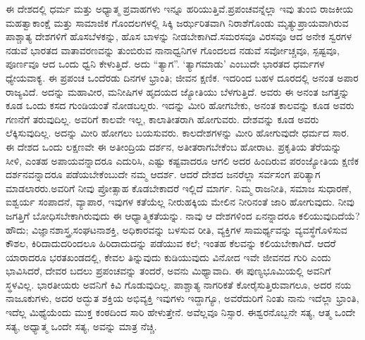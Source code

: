 ಈ ದೇಶದಲ್ಲಿ ಧರ್ಮ ಮತ್ತು ಅಧ್ಯಾತ್ಮ ಪ್ರವಾಹಗಳು ಇನ್ನೂ ಹರಿಯುತ್ತಿವೆ.\break ಪ್ರಪಂಚವನ್ನೆಲ್ಲಾ ಇವು ತುಂಬಿ ರಾಜಕೀಯ ಮಹತ್ವಾಕಾಂಕ್ಷೆ ಮತ್ತು ಸಾಮಾಜಿಕ ಗೊಂದಲಗಳಲ್ಲಿ ಸಿಕ್ಕಿ ಜರ್ಝರಿತವಾಗಿ ನಿರಾಶೆಗೊಂಡು ಮೃತ್ಯುಪ್ರಾಯವಾಗಿರುವ ಪಾಶ್ಚಾತ್ಯ ದೇಶಗಳಿಗೆ ಹೊಸಬೆಳಕನ್ನು, ಹೊಸ ಬಾಳನ್ನು ನೀಡಬೇಕಾಗಿದೆ.\break ಸಮರಸವೂ ವಿರಸವೂ ಆದ ಅನೇಕ ಸ್ವರಗಳ ನಡುವೆ ಭಾರತದ ವಾತಾ\-ವರಣವನ್ನು ತುಂಬಿರುವ ನಾನಾಧ್ವನಿಗಳ ಗೊಂದಲದ ನಡುವೆ ಸರ್ವೋಚ್ಚವೂ, ಸ್ಪಷ್ಟವೂ, ಪೂರ್ಣವೂ ಆದ ಒಂದು ಧ್ವನಿ ಕೇಳುತ್ತಿದೆ. ಅದು “ತ್ಯಾಗ”. ‘ತ್ಯಾಗಮಾಡು’ ಎಂಬುದೇ ಭಾರತದ ಧರ್ಮಗಳ ಧ್ಯೇಯವಾಕ್ಯ. ಈ ಪ್ರಪಂಚ ಒಂದೆರಡು ದಿನಗಳ ಭ್ರಾಂತಿ; ಜೀವನ ಕ್ಷಣಿಕ. ಇದರಿಂದ ಬಹಳ ದೂರದಲ್ಲಿ ಅನಂತ ಅಪಾರ ರಾಜ್ಯವಿದೆ. ಅದನ್ನು ಮಹಾವೀರ, ಮನೀಷಿಗಳ ಹೃದಯದ ಜ್ಯೋತಿಯು ಬೆಳಗುತ್ತಿದೆ. ಅವರು ಈ ಅನಂತ ಜಗತ್ತನ್ನು ಕೂಡ ಒಂದು ಕಸದ ಗುಂಡಿಯಂತೆ ನೋಡಬಲ್ಲರು. ಇದನ್ನು ಮೀರಿ ಹೋಗಬೇಕು, ಅನಂತ ಕಾಲವನ್ನು ಕೂಡ ಅವರು ಗಣನೆಗೆ ತರುವುದಿಲ್ಲ. ಅವರಿಗೆ ಕಾಲವೇ ಇಲ್ಲ, ಕಾಲಾತೀತರಾಗಿ ಹೋಗುವರು. ದೇಶವನ್ನು ಕೂಡ ಅವರು ಲೆಕ್ಕಿಸುವುದಿಲ್ಲ. ಅದನ್ನು ಮೀರಿ ಹೋಗಲು ಬಯಸುವರು. ಕಾಲದೇಶಗಳನ್ನು ಮೀರಿ ಹೋಗುವುದೇ ಧರ್ಮದ ಸಾರ. ಈ ದೇಶದ ಒಂದು ಲಕ್ಷಣವೇ ಈ ಅತೀಂದ್ರಿಯ ದರ್ಶನ, ಅತೀತರಾಗಬೇಕೆಂಬ ಹೋರಾಟ. ಪ್ರಕೃತಿಯ ತೆರೆಯನ್ನು ಸೀಳಿ, ಎಂತಹ ಅಪಾಯವನ್ನಾದರೂ ಎದುರಿಸಿ, ಎಷ್ಟು ಕಷ್ಟವಾದರೂ ಆಗಲಿ ಅದರ ಹಿಂದಿರುವ ಪರಂಜ್ಯೋತಿಯ ಕ್ಷಣಿಕ ದರ್ಶನವನ್ನಾದರೂ ಪಡೆಯಬೇಕೆಂಬುದೇ ನಮ್ಮ ಆದರ್ಶ. ಆದರೆ ದೇಶದ ಜನರೆಲ್ಲಾ ಸರ್ವಸಂಗ ಪರಿತ್ಯಾಗ ಮಾಡಲಾರರು.\break ಅವರಿಗೆ ನೀವು ಪ್ರೋತ್ಸಾಹ ಕೊಡಬೇಕಾದರೆ ಇಲ್ಲಿದೆ ಮಾರ್ಗ. ನಿಮ್ಮ ರಾಜನೀತಿ, ಸಮಾಜ ಸುಧಾರಣೆ, ಐಶ್ವರ್ಯ ಸಂಪಾದನೆ, ವ್ಯಾಪಾರ, ಇವುಗಳ ಕತೆಯೆಲ್ಲ ನೀರುಹಕ್ಕಿಯ ಮೇಲಿನ ನೀರಿನಂತೆ ಜಾರಿ ಹೋಗುವುದು. ನೀವು ಜಗತ್ತಿಗೆ ಬೋಧಿಸಬೇಕಾಗಿರುವುದು ಈ ಆಧ್ಯಾತ್ಮಿಕತೆಯನ್ನು. ನಾವು ಆ ದೇಶಗಳಿಂದ ಏನನ್ನಾದರೂ ಕಲಿಯುವುದಿದೆಯೆ? ಹೌದು; ವಿಜ್ಞಾನಶಾಸ್ತ್ರ,\break ಸಂಘಟನಾಶಕ್ತಿ, ಅಧಿಕಾರವನ್ನು ಬಳಸುವ ರೀತಿ, ವ್ಯಕ್ತಿಗಳ ಸಾಮರ್ಥ್ಯವನ್ನು ವ್ಯವಸ್ಥೆಗೊಳಿಸುವ ಕೌಶಲ, ಕಿರಿದಾದುದರಿಂದಲೂ ಹಿರಿದಾದುದನ್ನು ಪಡೆಯುವ ಕಲೆ; ಇಂತಹ ಕೆಲವನ್ನು ಕಲಿಯಬೇಕಾಗಿದೆ. ಆದರೆ ಯಾರಾದರೂ ಭರತಖಂಡದಲ್ಲಿ, ಕೇವಲ ತಿನ್ನುವುದು ಕುಡಿಯುವುದು ವಿನೋದ ಇವೇ ಜೀವನದ ಗುರಿ ಎಂದು ಭಾವಿಸಿದರೆ, ದೇವರ ಬದಲು ಪ್ರಪಂಚವನ್ನು ತಂದರೆ, ಅವನು ಮಿಥ್ಯಾವಾದಿ. ಈ ಪುಣ್ಯಭೂಮಿಯಲ್ಲಿ ಅವನಿಗೆ ಸ್ಥಳವಿಲ್ಲ. ಭಾರತೀಯರು ಅವನಿಗೆ ಕಿವಿ ಗೊಡುವುದಿಲ್ಲ. ಪಾಶ್ಚಾತ್ಯ ನಾಗರಿಕತೆ ಕೋರೈಸುತ್ತಿರುವಾಗಲೂ, ಅದರ ನಯ ನಾಜೂಕುಗಳು, ಅದರ ಅದ್ಭುತ ಶಕ್ತಿಯ ಅಭಿವ್ಯಕ್ತಿ ಇವುಗಳು ಇದ್ದಾಗ್ಯೂ, ಅವರೆದುರಿಗೆ ನಿಂತು ನಾನು ಇದೆಲ್ಲಾ ಭ್ರಾಂತಿ, ಇದೆಲ್ಲ ಮಿಥ್ಯೆಯೆಂದು ಮುಕ್ತ ಕಂಠದಿಂದ ಸಾರಿ ಹೇಳುತ್ತೇನೆ. ಅವೆಲ್ಲವೂ ನಿಸ್ಸಾರ. ಈಶ್ವರನೊಬ್ಬನೇ ಸತ್ಯ, ಆತ್ಮ ಒಂದೇ ಸತ್ಯ, ಅಧ್ಯಾತ್ಮ ಒಂದೇ ಸತ್ಯ, ಅವನ್ನು ಮಾತ್ರ ನೆಚ್ಚಿ.

